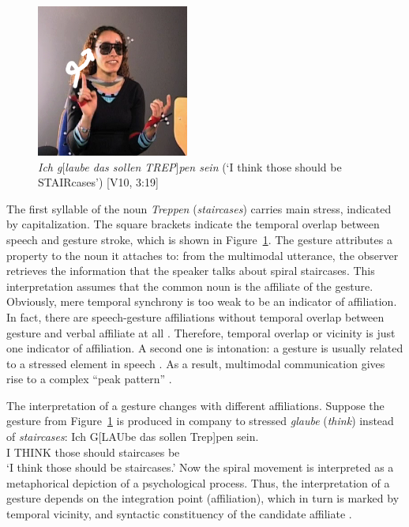 \documentclass[output=paper]{langsci/langscibook}
\begin{document}
\begin{figure}[tb]
  \includegraphics[trim={1cm 1cm 1cm 1cm}, clip, width=5cm]{figures/treppen-2}
  \caption[Staircases]{\textit{Ich g}[\textit{laube das sollen TREP}]\textit{pen sein} (\enquote*{I think those should be STAIRcases}) [V10, 3:19]}
  \label{fig:staircases}
\end{figure}

The first syllable of the  noun \textit{Treppen} (\textit{staircases}) carries main stress, indicated by capitalization. 
%
The square brackets indicate the temporal overlap between speech and gesture stroke, which is shown in Figure~\ref{fig:staircases}.
%
The gesture attributes a property to the noun it attaches to: from the multimodal utterance, the observer retrieves the information that the speaker talks about spiral staircases. 
%
This interpretation assumes that the common noun is the affiliate of the gesture.
%
Obviously, mere temporal synchrony is too weak to be an indicator of affiliation.
%
In fact, there are speech-gesture affiliations without temporal overlap between gesture and verbal affiliate at all \citep[e.g.][]{Luecking:Rieser:Stegmann:2004}.
%
Therefore, temporal overlap or vicinity is just one indicator of affiliation. A second one is intonation: a gesture is usually related to a stressed element in speech \citep{McClave:1994,Nobe:2000,Loehr:2004,Loehr:2007}. 
%
As a result, multimodal communication gives rise to a complex \enquote{peak pattern} \citep{Tuite:1993,Loehr:2004,Jannedy:Mendoza-Denton:2005}.


The interpretation of a gesture changes with different affiliations. 
%
Suppose the gesture from Figure~\ref{fig:staircases} is produced in company to stressed \textit{glaube} (\textit{think}) instead of \textit{staircases}: 
%
\ea \label{ex:think}
\gll Ich G[LAUbe das sollen Trep]pen sein.\\
     I THINK those should staircases be \\
\glt \enquote*{I think those should be staircases.}
\z
%
Now the spiral movement is interpreted as a metaphorical depiction of a psychological process.
%
Thus, the interpretation of a gesture depends on the integration point (affiliation),  which in turn is marked by temporal vicinity,  and syntactic constituency of the candidate affiliate \citep{Alahverdzhieva:Lascarides:Flickinger:2017}.
\end{document}
